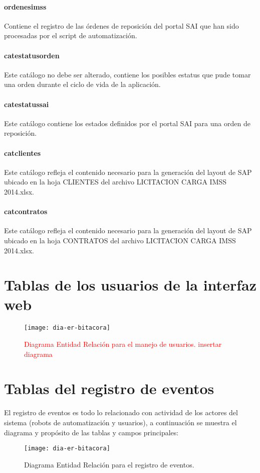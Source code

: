 \paragraph{ordenes{\textunderscore}imss} Contiene el registro de las órdenes de reposición del portal SAI que han sido procesadas por el script de automatización.

\paragraph{cat{\textunderscore}estatus{\textunderscore}orden} Este catálogo no debe ser alterado, contiene los posibles estatus que pude tomar una orden durante el ciclo de vida de la aplicación.

\paragraph{cat{\textunderscore}estatus{\textunderscore}sai} Este catálogo contiene los estados definidos por el portal SAI para una orden de reposición.

\paragraph{cat{\textunderscore}clientes} Este catálogo refleja el contenido necesario para la generación del layout de SAP ubicado en la hoja CLIENTES del archivo LICITACION  CARGA IMSS 2014.xlsx.

\paragraph{cat{\textunderscore}contratos} Este catálogo refleja el contenido necesario para la generación del layout de SAP ubicado en la hoja CONTRATOS del archivo LICITACION  CARGA IMSS 2014.xlsx.


\section{Tablas de los usuarios de la interfaz web}
\begin{figure}[h]
  \centering
  \texttt{[image: dia-er-bitacora]} 
  \caption{\textcolor{red}{Diagrama Entidad Relación para el manejo de usuarios. \newline insertar diagrama}}
  \label{fig:dia-er-bitacora}
\end{figure}

\section{Tablas del registro de eventos}
El registro de eventos es todo lo relacionado con actividad de los actores del sistema (robots de automatización y usuarios), a continuación se muestra el diagrama y propósito de las tablas y campos principales:
\begin{figure}[h]
  \centering
  \texttt{[image: dia-er-bitacora]} 
  \caption{Diagrama Entidad Relación para el registro de eventos.}
  \label{fig:dia-er-bitacora}
\end{figure}

